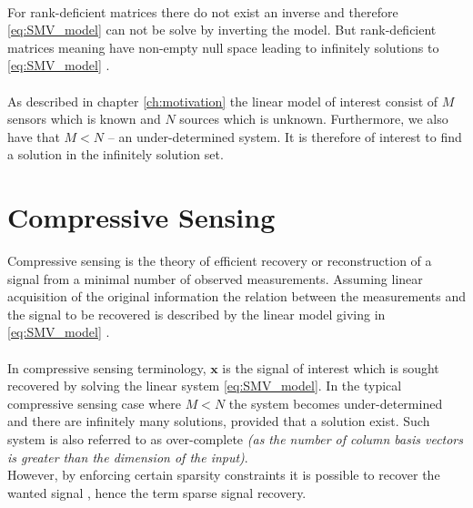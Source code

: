 \\
For rank-deficient matrices there do not exist an inverse and therefore \eqref{eq:SMV_model} can not be solve by inverting the model. But rank-deficient matrices  meaning have non-empty null space leading to infinitely solutions to \eqref{eq:SMV_model} \cite[p. ix]{CS}.
\\ \\
As described in chapter \ref{ch:motivation} the linear model of interest consist of $M$ sensors which is known and $N$ sources which is unknown. Furthermore, we also have that $M < N$ -- an under-determined system. It is therefore of interest to find a solution in the infinitely solution set.

\section{Compressive Sensing}\label{sec:CS}
Compressive sensing is the theory of efficient recovery or reconstruction of a signal from a minimal number of observed measurements. Assuming linear acquisition of the original information the relation between the measurements and the signal to be recovered is described by the linear model giving in \eqref{eq:SMV_model} \cite{FR}.  
\\ \\
In compressive sensing terminology, $\mathbf{x}$ is the signal of interest which is sought recovered by solving the linear system \eqref{eq:SMV_model}. In the typical compressive sensing case where $M < N$ the system becomes under-determined and there are infinitely many solutions, provided that a solution exist. Such system is also referred to as over-complete \textit{(as the number of column basis vectors is greater than the dimension of the input)}.
\\
However, by enforcing certain sparsity constraints it is possible to recover the wanted signal \cite{FR}, hence the term sparse signal recovery.


